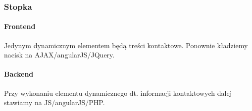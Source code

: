 \documentclass{scrartcl}
\begin{document}
\subsubsection{Stopka}
\paragraph{Frontend}
Jedynym dynamicznym elementem będą treści kontaktowe. Ponownie kładziemy nacisk na AJAX/angularJS/JQuery.
\paragraph{Backend}
Przy wykonaniu elementu dynamicznego dt. informacji kontaktowych dalej stawiamy na JS/angularJS/PHP.





\end{document}
